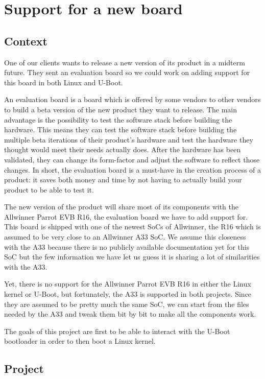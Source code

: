 \chapter{Support for a new board}

\section{Context}
One of our clients wants to release a new version of its product in a midterm future. They sent an evaluation board so we could work on adding support for this board in both Linux and U-Boot.

An evaluation board is a board which is offered by some vendors to other vendors to build a beta version of the new product they want to release. The main advantage is the possibility to test the software stack before building the hardware. This means they can test the software stack before building the multiple beta iterations of their product's hardware and test the hardware they thought would meet their needs actually does. After the hardware has been validated, they can change its form-factor and adjust the software to reflect those changes. In short, the evaluation board is a must-have in the creation process of a product: it saves both money and time by not having to actually build your product to be able to test it.

The new version of the product will share most of its components with the Allwinner Parrot EVB R16, the evaluation board we have to add support for. This board is shipped with one of the newest SoCs of Allwinner, the R16 which is assumed to be very close to an Allwinner A33 SoC. We assume this closeness with the A33 because there is no publicly available documentation yet for this SoC but the few information we have let us guess it is sharing a lot of similarities with the A33.

Yet, there is no support for the Allwinner Parrot EVB R16 in either the Linux kernel or U-Boot, but fortunately, the A33 is supported in both projects. Since they are assumed to be pretty much the same SoC, we can start from the files needed by the A33 and tweak them bit by bit to make all the components work.

The goals of this project are first to be able to interact with the U-Boot bootloader in order to then boot a Linux kernel.

\section{Project}

